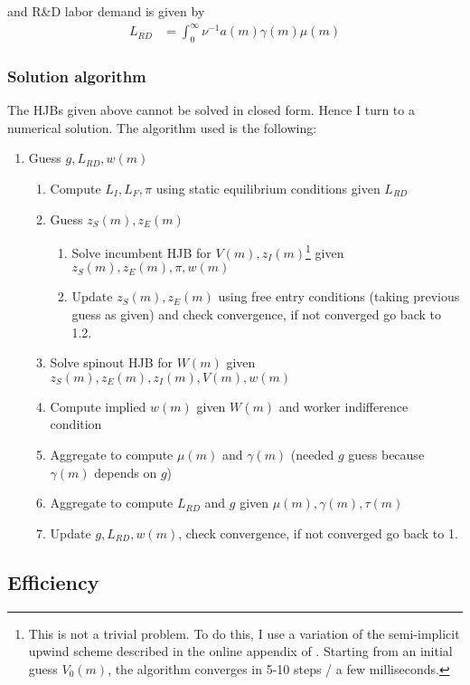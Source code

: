 \documentclass[11pt,english]{article}
\theoremstyle{remark}
\begin{document}
and R\&D labor demand is given by 
\begin{align*}
	L_{RD} &= \int_0^{\infty} \nu^{-1} a(m) \gamma(m) \mu(m)
\end{align*}

\subsubsection{Solution algorithm}\label{solution_algorithm}

The HJBs given above cannot be solved in closed form. Hence I turn to a numerical solution. The algorithm used is the following:

\begin{enumerate}
	\item Guess $g, L_{RD}, w(m)$
	\begin{enumerate}
		\item Compute $L_I,L_F,\pi$ using static equilibrium conditions given $L_{RD}$ 
		\item Guess $z_S(m),z_E(m)$ 
		\begin{enumerate}
			\item Solve incumbent HJB for $V(m),z_I(m)$\footnote{This is not a trivial problem. To do this, I use a variation of the semi-implicit upwind scheme described in the online appendix of \cite{achdou_income_2017}. Starting from an initial guess $V_0(m)$, the algorithm converges in 5-10 steps / a few milliseconds.} given $z_S(m),z_E(m),\pi,w(m)$
			\item Update $z_S(m),z_E(m)$ using free entry conditions (taking previous guess as given) and check convergence, if not converged go back to 1.2.
		\end{enumerate}
		\item Solve spinout HJB for $W(m)$ given $z_S(m),z_E(m),z_I(m),V(m),w(m)$
		\item Compute implied $w(m)$ given $W(m)$ and worker indifference condition
		\item Aggregate to compute $\mu(m)$ and $\gamma(m)$ (needed $g$ guess because $\gamma(m)$ depends on $g$)
		\item Aggregate to compute $L_{RD}$ and $g$ given $\mu(m),\gamma(m),\tau(m)$
		\item Update $g,L_{RD},w(m)$, check convergence, if not converged go back to 1.
	\end{enumerate}
\end{enumerate}

\subsection{Efficiency}
\end{document}
